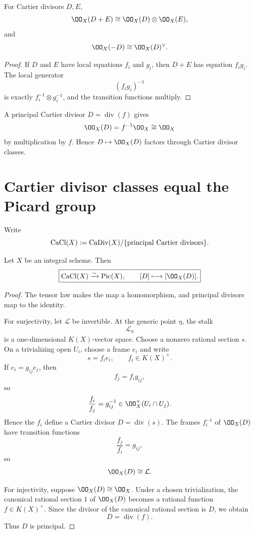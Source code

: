 \begin{proposition}\label{prop:vi42-divisor-tensor}
For Cartier divisors \(D,E\),
\[
  \OO_X(D+E)
  \cong
  \OO_X(D)\otimes\OO_X(E),
\]
and
\[
  \OO_X(-D)\cong\OO_X(D)^\vee.
\]
\end{proposition}

\begin{proof}
If \(D\) and \(E\) have local equations \(f_i\) and \(g_i\), then \(D+E\) has equation \(f_ig_i\).  The local generator
\[
  (f_ig_i)^{-1}
\]
is exactly \(f_i^{-1}\otimes g_i^{-1}\), and the transition functions multiply.
\end{proof}

A principal Cartier divisor \(D=\operatorname{div}(f)\) gives
\[
  \OO_X(D)=f^{-1}\OO_X\cong\OO_X
\]
by multiplication by \(f\).  Hence \(D\mapsto\OO_X(D)\) factors through Cartier divisor classes.



\section{Cartier divisor classes equal the Picard group}

Write
\[
  \operatorname{CaCl}(X)
  :=
  \operatorname{CaDiv}(X)/\{\text{principal Cartier divisors}\}.
\]

\begin{theorem}\label{thm:vi42-cartier-picard}
Let \(X\) be an integral scheme.  Then
\[
  \boxed{
  \CaCl(X)\xrightarrow{\sim}\Pic(X),
  \qquad
  [D]\longmapsto[\OO_X(D)].
  }
\]
\end{theorem}

\begin{proof}
The tensor law makes the map a homomorphism, and principal divisors map to the identity.

For surjectivity, let \(\mathcal L\) be invertible.  At the generic point \(\eta\), the stalk
\[
  \mathcal L_\eta
\]
is a one-dimensional \(K(X)\)-vector space.  Choose a nonzero rational section \(s\).  On a trivializing open \(U_i\), choose a frame \(e_i\) and write
\[
  s=f_i e_i,\qquad f_i\in K(X)^\times.
\]
If \(e_i=g_{ij}e_j\), then
\[
  f_j=f_i g_{ij},
\]
so
\[
  \frac{f_i}{f_j}=g_{ij}^{-1}\in\OO_X^\times(U_i\cap U_j).
\]
Hence the \(f_i\) define a Cartier divisor \(D=\operatorname{div}(s)\).  The frames \(f_i^{-1}\) of \(\OO_X(D)\) have transition functions
\[
  \frac{f_j}{f_i}=g_{ij},
\]
so
\[
  \OO_X(D)\cong\mathcal L.
\]

For injectivity, suppose \(\OO_X(D)\cong\OO_X\).  Under a chosen trivialization, the canonical rational section \(1\) of \(\OO_X(D)\) becomes a rational function \(f\in K(X)^\times\).  Since the divisor of the canonical rational section is \(D\), we obtain
\[
  D=\operatorname{div}(f).
\]
Thus \(D\) is principal.
\end{proof}

